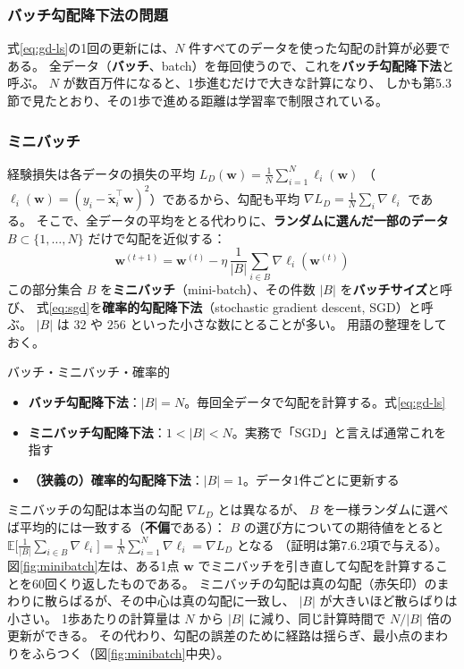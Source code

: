 \subsubsection{バッチ勾配降下法の問題}

式\eqref{eq:gd-ls}の1回の更新には、$N$ 件すべてのデータを使った勾配の計算が必要である。
全データ（\textbf{バッチ}、batch）を毎回使うので、これを\textbf{バッチ勾配降下法}と呼ぶ。
$N$ が数百万件になると、1歩進むだけで大きな計算になり、
しかも第5.3節で見たとおり、その1歩で進める距離は学習率で制限されている。

\subsubsection{ミニバッチ}

経験損失は各データの損失の平均 $L_D(\bm{w}) = \frac{1}{N}\sum_{i=1}^{N} \ell_i(\bm{w})$
（$\ell_i(\bm{w}) = (y_i - \tilde{\bm{x}}_i^\top\bm{w})^2$）であるから、勾配も平均
$\nabla L_D = \frac{1}{N}\sum_i \nabla \ell_i$ である。
そこで、全データの平均をとる代わりに、\textbf{ランダムに選んだ一部のデータ}
$B \subset \{1, \ldots, N\}$ だけで勾配を近似する：
\begin{equation}
  \bm{w}^{(t+1)} = \bm{w}^{(t)} - \eta\, \frac{1}{|B|}\sum_{i \in B} \nabla \ell_i(\bm{w}^{(t)})
  \label{eq:sgd}
\end{equation}
この部分集合 $B$ を\textbf{ミニバッチ}（mini-batch）、その件数 $|B|$ を\textbf{バッチサイズ}と呼び、
式\eqref{eq:sgd}を\textbf{確率的勾配降下法}（stochastic gradient descent, SGD）と呼ぶ。
$|B|$ は $32$ や $256$ といった小さな数にとることが多い。
用語の整理をしておく。

\begin{itembox}[l]{バッチ・ミニバッチ・確率的}
\begin{itemize}
  \item \textbf{バッチ勾配降下法}：$|B| = N$。毎回全データで勾配を計算する。式\eqref{eq:gd-ls}
  \item \textbf{ミニバッチ勾配降下法}：$1 < |B| < N$。実務で「SGD」と言えば通常これを指す
  \item \textbf{（狭義の）確率的勾配降下法}：$|B| = 1$。データ1件ごとに更新する
\end{itemize}
\end{itembox}

ミニバッチの勾配は本当の勾配 $\nabla L_D$ とは異なるが、
$B$ を一様ランダムに選べば平均的には一致する（\textbf{不偏}である）：
$B$ の選び方についての期待値をとると
$\mathbb{E}\bigl[\frac{1}{|B|}\sum_{i \in B}\nabla\ell_i\bigr] = \frac{1}{N}\sum_{i=1}^{N}\nabla\ell_i = \nabla L_D$ となる
（証明は第7.6.2項で与える）。
図\ref{fig:minibatch}左は、ある1点 $\bm{w}$ でミニバッチを引き直して勾配を計算することを60回くり返したものである。
ミニバッチの勾配は真の勾配（赤矢印）のまわりに散らばるが、その中心は真の勾配に一致し、
$|B|$ が大きいほど散らばりは小さい。
1歩あたりの計算量は $N$ から $|B|$ に減り、同じ計算時間で $N/|B|$ 倍の更新ができる。
その代わり、勾配の誤差のために経路は揺らぎ、最小点のまわりをふらつく（図\ref{fig:minibatch}中央）。

